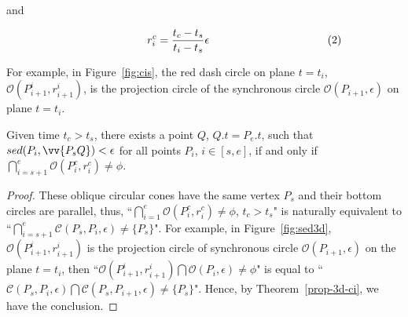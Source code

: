 and

\vspace{-1ex}
\begin{equation*}
\label{equ-proj-circle-r}
    \begin{aligned}
        \hspace{17ex}  r^c_i =\frac{t_c-t_s}{t_i-t_s}{\epsilon}   \hspace{25ex}(2) \\
    \end{aligned}
\end{equation*}
\vspace{-1ex}



For example, in Figure~\ref{fig:cis}, the red dash circle on plane $t=t_i$, \ie $\mathcal{O}(P^i_{i+1}, r^i_{i+1})$, is the projection circle of the synchronous circle $\mathcal{O}(P_{i+1}, \epsilon)$ on plane $t=t_i$.

\vspace{1ex}

\begin{cor}
\label{prop-circle-intersection}
Given time $t_c > t_s$, there exists a point $Q$, $Q.t = P_e.t$, such that $sed(P_i, \vv{P_sQ})<\epsilon$ for all points $P_i$, $i \in [s,e]$, if and only if $\bigcap_{i=s+1}^{e}{\mathcal{O}(P^c_i, r^c_i)} \ne \phi$.
\end{cor}


\begin{proof}
These oblique circular cones have the same vertex $P_s$ and their bottom circles are parallel, thus,
 ``$\bigcap_{i=1}^{e}{\mathcal{O}(P^c_i, r^c_i)} \ne \phi$, $t_c > t_s$" is naturally equivalent to ``$\bigcap_{i=s+1}^{e}{\mathcal{C}(P_s, P_i, \epsilon)} \ne \{P_s\}$".
For example, in Figure~\ref{fig:sed3d}, $\mathcal{O}(P^i_{i+1}, r^i_{i+1})$ is the projection circle of synchronous circle $\mathcal{O}(P_{i+1}, \epsilon)$ on the plane $t=t_i$, then ``${\mathcal{O}(P^i_{i+1}, r^i_{i+1})} \bigcap{\mathcal{O}(P_i, \epsilon)} \ne \phi$" is equal to ``$\mathcal{C}(P_s, P_i, \epsilon) \bigcap {\mathcal{C}(P_s, P_{i+1}, \epsilon)} \ne \{P_s\}$".
Hence, by Theorem~\ref{prop-3d-ci}, we have the conclusion.
\end{proof}









